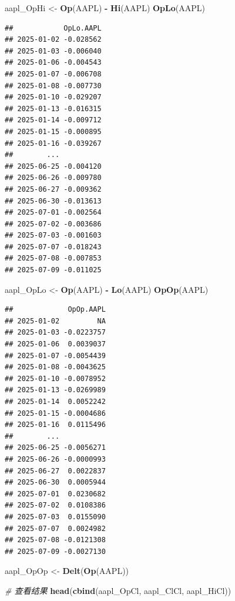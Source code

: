 \documentclass[]{ctexbook}
\newenvironment{Shaded}{\begin{snugshade}}{\end{snugshade}}
\newcommand{\CommentTok}[1]{\textcolor[rgb]{0.56,0.35,0.01}{\textit{#1}}}
\newcommand{\FunctionTok}[1]{\textcolor[rgb]{0.13,0.29,0.53}{\textbf{#1}}}
\newcommand{\NormalTok}[1]{#1}
\newcommand{\OtherTok}[1]{\textcolor[rgb]{0.56,0.35,0.01}{#1}}
\newcommand{\SpecialCharTok}[1]{\textcolor[rgb]{0.81,0.36,0.00}{\textbf{#1}}}
\begin{document}
\begin{Shaded}
\begin{Highlighting}[]
\NormalTok{aapl\_OpHi }\OtherTok{\textless{}{-}} \FunctionTok{Op}\NormalTok{(AAPL) }\SpecialCharTok{{-}} \FunctionTok{Hi}\NormalTok{(AAPL)}
\FunctionTok{OpLo}\NormalTok{(AAPL)}
\end{Highlighting}
\end{Shaded}

\begin{verbatim}
##            OpLo.AAPL
## 2025-01-02 -0.028562
## 2025-01-03 -0.006040
## 2025-01-06 -0.004543
## 2025-01-07 -0.006708
## 2025-01-08 -0.007730
## 2025-01-10 -0.029207
## 2025-01-13 -0.016315
## 2025-01-14 -0.009712
## 2025-01-15 -0.000895
## 2025-01-16 -0.039267
##        ...          
## 2025-06-25 -0.004120
## 2025-06-26 -0.009780
## 2025-06-27 -0.009362
## 2025-06-30 -0.013613
## 2025-07-01 -0.002564
## 2025-07-02 -0.003686
## 2025-07-03 -0.001603
## 2025-07-07 -0.018243
## 2025-07-08 -0.007853
## 2025-07-09 -0.011025
\end{verbatim}

\begin{Shaded}
\begin{Highlighting}[]
\NormalTok{aapl\_OpLo }\OtherTok{\textless{}{-}} \FunctionTok{Op}\NormalTok{(AAPL) }\SpecialCharTok{{-}} \FunctionTok{Lo}\NormalTok{(AAPL)}
\FunctionTok{OpOp}\NormalTok{(AAPL)}
\end{Highlighting}
\end{Shaded}

\begin{verbatim}
##             OpOp.AAPL
## 2025-01-02         NA
## 2025-01-03 -0.0223757
## 2025-01-06  0.0039037
## 2025-01-07 -0.0054439
## 2025-01-08 -0.0043625
## 2025-01-10 -0.0078952
## 2025-01-13 -0.0269989
## 2025-01-14  0.0052242
## 2025-01-15 -0.0004686
## 2025-01-16  0.0115496
##        ...           
## 2025-06-25 -0.0056271
## 2025-06-26 -0.0000993
## 2025-06-27  0.0022837
## 2025-06-30  0.0005944
## 2025-07-01  0.0230682
## 2025-07-02  0.0108386
## 2025-07-03  0.0155090
## 2025-07-07  0.0024982
## 2025-07-08 -0.0121308
## 2025-07-09 -0.0027130
\end{verbatim}

\begin{Shaded}
\begin{Highlighting}[]
\NormalTok{aapl\_OpOp }\OtherTok{\textless{}{-}} \FunctionTok{Delt}\NormalTok{(}\FunctionTok{Op}\NormalTok{(AAPL))}

\CommentTok{\# 查看结果}
\FunctionTok{head}\NormalTok{(}\FunctionTok{cbind}\NormalTok{(aapl\_OpCl, aapl\_ClCl, aapl\_HiCl))}
\end{Highlighting}
\end{Shaded}
\end{document}
